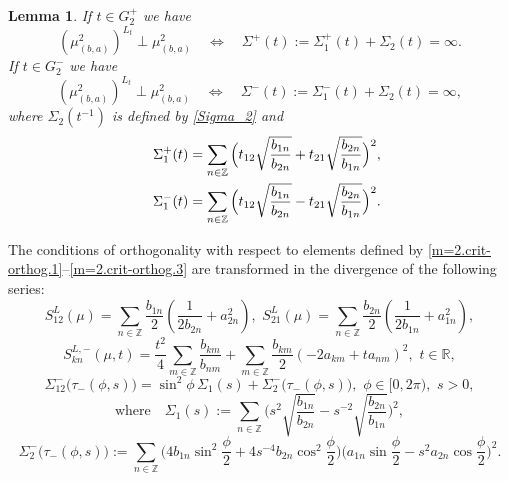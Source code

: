 \documentclass[preprint,12pt]{elsarticle}
\newtheorem{lem}[thm]{Lemma}
\numberwithin{equation}{section}
\begin{document}
\begin{lem}
If $t\in  G^+_2$
we have
$$
(\mu_{(b,a)}^2)^{L_t}\perp\mu_{(b,a)}^2\quad\Leftrightarrow\quad\Sigma^+(t):=\Sigma_1^+(t)+
\Sigma_2(t)=\infty.
$$
If $t\in G^-_2$
we have
$$
(\mu_{(b,a)}^2)^{L_t}\perp\mu_{(b,a)}^2\quad\Leftrightarrow\quad\Sigma^{-}(t):=\Sigma_1^{-}(t)+
\Sigma_2(t)=\infty,
$$
where  $\Sigma_2(t^{-1})$ is defined by \eqref{Sigma_2} and
%
\begin{eqnarray}
\label{Sigma_1^+(t).m=2}
 &&\Sigma_1^+(t)=\sum_{n\in{\mathbb
Z}}\Big(t_{12}\sqrt{\frac{b_{1n}}{b_{2n}}}+
t_{21}\sqrt{\frac{b_{2n}}{b_{1n}}}\Big)^2,\\
\label{Sigma_1^{-}(t).m=2}
&&\Sigma_1^{-}(t)=\sum_{n\in{\mathbb
Z}}\Big(t_{12}\sqrt{\frac{b_{1n}}{b_{2n}}}-
t_{21}\sqrt{\frac{b_{2n}}{b_{1n}}}\Big)^2.
\end{eqnarray}
\end{lem}
The conditions of 
orthogonality with respect to elements defined by
%
\eqref{m=2.crit-orthog.1}--\eqref{m=2.crit-orthog.3} 
are transformed in the divergence of the following series:
\begin{equation}
\label{S^L_(kn)}
S^L_{12}(\mu)=\sum_{n\in {\mathbb Z}}
\frac{b_{1n}}{2}\left(\frac{1}{2b_{2n}}+a_{2n}^2\right),\,\,
S^L_{21}(\mu)=\sum_{n\in {\mathbb Z}}
\frac{b_{2n}}{2}\left(\frac{1}{2b_{1n}}+a_{1n}^2\right),
\end{equation}
\begin{equation}
\label{S^(L,-)_(kn)}
S^{L,-}_{kn}(\mu,t)=\frac{t^2}{4}\sum_{m\in{\mathbb
Z}}\frac{b_{km}}{b_{nm}}+ \sum_{m\in{\mathbb
Z}}\frac{b_{km}}{2}(-2a_{km}+ta_{nm})^2,\,\,t\in\mathbb R,
\end{equation}
\begin{equation}
 \label{(phi,s)}
\Sigma^-_{12}\big(\tau_{-}(\phi,s)\big)=\sin^2\phi\,\Sigma_1(s)+\Sigma^-_2\big(\tau_{-}(\phi,s)\big),\,\,\phi\in[0,2\pi),\,\,s>0,
\end{equation}
\begin{equation}
\label{sigma1(s)}
\text{where}\quad\Sigma_1(s):=\!\sum_{n\in {\mathbb Z}}
\Big(s^2\sqrt{\frac{b_{1n}}{b_{2n}}}\!-\!s^{-2}\sqrt{\frac{b_{2n}}{b_{1n}}}\Big)^2,
\end{equation}
%
{\small
\begin{equation}
\label{sigma2(s)} \Sigma^-_2\big(\tau_{-}(\phi,s)\big)\!:=\!\sum_{n\in
{\mathbb Z}}
\Big(4b_{1n}\sin^2\frac{\phi}{2}\!+\!4s^{-4}b_{2n}\cos^2\frac{\phi}{2}\Big)
\Big(a_{1n}\sin\frac{\phi}{2}\!-\!s^2a_{2n}\cos\frac{\phi}{2}\Big)^2.
\end{equation}
}
%
\end{document}
